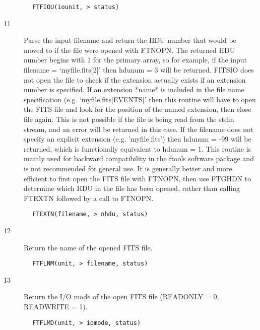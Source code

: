 \documentclass[11pt]{book}
\begin{document}
\begin{verbatim}
        FTFIOU(iounit, > status)
\end{verbatim}

\begin{description}
\item[11]  Parse the input filename and return the HDU number that would be
moved to if the file were opened with FTNOPN.    The returned HDU
number begins with 1 for the primary array, so for example, if the
input filename = `myfile.fits[2]' then hdunum = 3 will be returned.
FITSIO does not open the file to check if the extension actually exists
if an extension number is specified. If an extension *name* is included
in the file name specification (e.g.  `myfile.fits[EVENTS]' then this
routine will have to open the FITS file and look for the position of
the named extension, then close file again.  This is not possible if
the file is being read from the stdin stream, and an error will be
returned in this case.  If the filename does not specify an explicit
extension (e.g. 'myfile.fits') then hdunum = -99 will be returned,
which is functionally equivalent to hdunum = 1. This routine is mainly
used for backward compatibility in the ftools software package and is
not recommended for general use.  It is generally better and more
efficient to first open the FITS file with FTNOPN, then use FTGHDN to
determine which HDU in the file has been opened, rather than calling
 FTEXTN followed by a call to FTNOPN.
\end{description}

\begin{verbatim}
        FTEXTN(filename, > nhdu, status)
\end{verbatim}

\begin{description}
\item[12] Return the name of the opened FITS file.
\end{description}

\begin{verbatim}
        FTFLNM(unit, > filename, status)
\end{verbatim}

\begin{description}
\item[13] Return the I/O mode of the open FITS file (READONLY = 0, READWRITE = 1).
\end{description}

\begin{verbatim}
        FTFLMD(unit, > iomode, status)
\end{verbatim}
\end{document}
